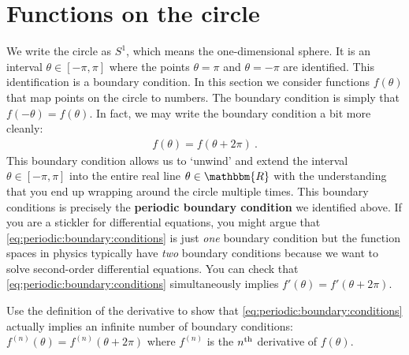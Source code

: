 \documentclass[12pt, oneside]{report}    %
\let\oldsection\section
\def\section{%
  \setcounter{sidenote}{1}%
  \oldsection
}
\begin{document}
\section{Functions on the circle}

We write the circle as $S^1$, which means the one-dimensional sphere. It is an interval $\theta \in [-\pi, \pi]$ where the points $\theta = \pi$ and $\theta = -\pi$ are identified. This identification is a boundary condition. In this section we consider functions $f(\theta)$ that map points on the circle to numbers. The boundary condition is simply that $f(-\theta) = f(\theta)$. In fact, we may write the boundary condition a bit more cleanly:
\begin{align}
    f(\theta) = f(\theta+2\pi) 
    \label{eq:periodic:boundary:conditions}
    \ .
\end{align}
This boundary condition allows us to `unwind' and extend the interval $\theta \in [-\pi, \pi]$ into the entire real line $\theta \in \mathbbm{R}$ with the understanding that you end up wrapping around the circle multiple times.
% 
This boundary conditions is precisely the \textbf{periodic boundary condition} we identified above.  
% 
If you are a stickler for differential equations, you might argue that \eqref{eq:periodic:boundary:conditions} is just \emph{one} boundary condition but the function spaces in physics typically have \emph{two} boundary conditions because we want to solve second-order differential equations. You can check that \eqref{eq:periodic:boundary:conditions} simultaneously implies $f'(\theta) = f'(\theta + 2\pi)$.

\begin{exercise}
Use the definition of the derivative to show that \eqref{eq:periodic:boundary:conditions} actually implies an infinite number of boundary conditions: $f^{(n)}(\theta) = f^{(n)}(\theta+ 2\pi)$ where $f^{(n)}$ is the $n^\textnormal{th}$ derivative of $f(\theta)$. 
\end{exercise}
\end{document}
